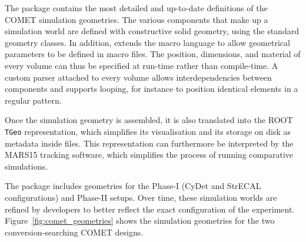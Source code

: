 The \SimG package contains the most detailed and up-to-date definitions of the
COMET simulation geometries. The various components that make up a simulation
world are defined with constructive solid geometry, using the standard \Geant
geometry classes. In addition, \SimG extends the \Geant macro language to allow
geometrical parameters to be defined in macro files. The position, dimensions,
and material of every volume can thus be specified at run-time rather than
compile-time. A custom parser attached to every volume allows interdependencies
between components and supports looping, for instance to position identical
elements in a regular pattern.

Once the simulation geometry is assembled, it is also translated into the ROOT
\texttt{TGeo} representation, which simplifies its visualisation and its storage
on disk as metadata inside \oaEvent files. This representation can furthermore
be interpreted by the MARS15 tracking software, which simplifies the process of
running comparative simulations.


The \SimG package includes geometries for the Phase\nobreakdash-I (CyDet and StrECAL
configurations) and Phase\nobreakdash-II setups. Over time, these simulation worlds are
refined by developers to better reflect the exact configuration of the
experiment. Figure~\ref{fig:comet_geometries} shows the simulation geometries
for the two conversion-searching COMET designs.




